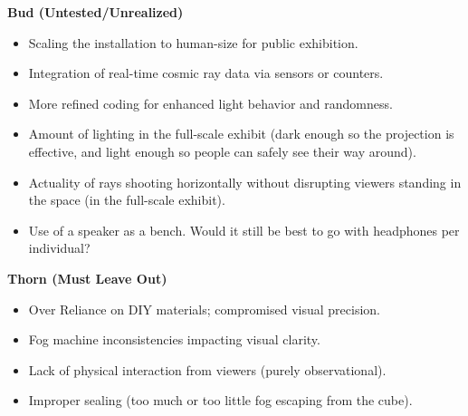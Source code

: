 \documentclass{article}
\begin{document}
\textbf{Bud (Untested/Unrealized)}
 \begin{itemize}
     \item Scaling the installation to human-size for public exhibition.
     \item Integration of real-time cosmic ray data via sensors or counters.
     \item More refined coding for enhanced light behavior and randomness.
     \item Amount of lighting in the full-scale exhibit (dark enough so the projection is effective, and light enough so people can safely see their way around).
     \item Actuality of rays shooting horizontally without disrupting viewers standing in the space (in the full-scale exhibit).
     \item Use of a speaker as a bench. Would it still be best to go with headphones per individual?
 \end{itemize}


 \textbf{Thorn (Must Leave Out)}
 \begin{itemize}
     \item Over Reliance on DIY materials; compromised visual precision.
    \item Fog machine inconsistencies impacting visual clarity.
    \item Lack of physical interaction from viewers (purely observational).
    \item Improper sealing (too much or too little fog escaping from the cube).
 \end{itemize}
\end{document}
